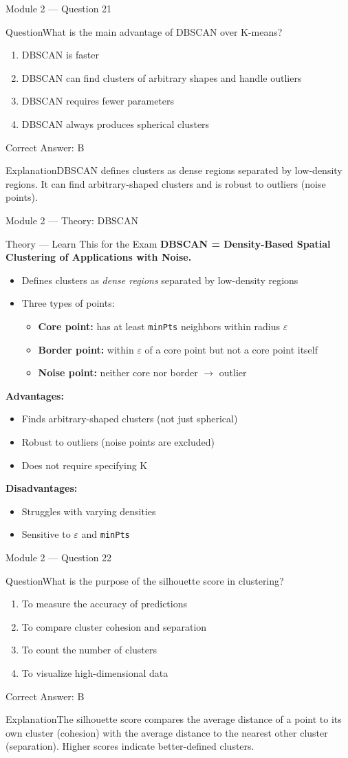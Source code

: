 \documentclass[aspectratio=169,10pt]{beamer}
\newcommand{\question}[1]{\begin{block}{Question}#1\end{block}}
\newcommand{\options}[4]{%
	\begin{enumerate}[label=\Alph*.,leftmargin=*]
		\item #1
		\item #2
		\item #3
		\item #4
	\end{enumerate}
}
\newcommand{\answerbox}[1]{\begin{exampleblock}{Correct Answer: #1}\end{exampleblock}}
\newcommand{\explain}[1]{\begin{block}{Explanation}#1\end{block}}
\newcommand{\theory}[1]{%
	\begin{block}{Theory --- Learn This for the Exam}
		\small #1
	\end{block}
}
\begin{document}
	\begin{frame}{Module 2 --- Question 21}
		\question{What is the main advantage of DBSCAN over K-means?}
		\options{DBSCAN is faster}{DBSCAN can find clusters of arbitrary shapes and handle outliers}{DBSCAN requires fewer parameters}{DBSCAN always produces spherical clusters}
		\answerbox{B}
		\explain{DBSCAN defines clusters as dense regions separated by low-density regions. It can find arbitrary-shaped clusters and is robust to outliers (noise points).}
	\end{frame}
	
	\begin{frame}{Module 2 --- Theory: DBSCAN}
		\theory{
			\textbf{DBSCAN = Density-Based Spatial Clustering of Applications with Noise.}
			\begin{itemize}
				\item Defines clusters as \emph{dense regions} separated by low-density regions
				\item Three types of points:
				\begin{itemize}
					\item \textbf{Core point:} has at least \texttt{minPts} neighbors within radius $\varepsilon$
					\item \textbf{Border point:} within $\varepsilon$ of a core point but not a core point itself
					\item \textbf{Noise point:} neither core nor border $\rightarrow$ outlier
				\end{itemize}
			\end{itemize}
			\textbf{Advantages:}
			\begin{itemize}
				\item Finds arbitrary-shaped clusters (not just spherical)
				\item Robust to outliers (noise points are excluded)
				\item Does not require specifying K
			\end{itemize}
			\textbf{Disadvantages:}
			\begin{itemize}
				\item Struggles with varying densities
				\item Sensitive to $\varepsilon$ and \texttt{minPts}
			\end{itemize}
		}
	\end{frame}
	
	\begin{frame}{Module 2 --- Question 22}
		\question{What is the purpose of the silhouette score in clustering?}
		\options{To measure the accuracy of predictions}{To compare cluster cohesion and separation}{To count the number of clusters}{To visualize high-dimensional data}
		\answerbox{B}
		\explain{The silhouette score compares the average distance of a point to its own cluster (cohesion) with the average distance to the nearest other cluster (separation). Higher scores indicate better-defined clusters.}
	\end{frame}
	
\end{document}
